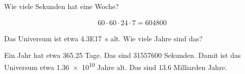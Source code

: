 
\begin{aufgabe}
	Wie viele Sekunden hat eine Woche?
	\begin{loesung}
		\begin{eqnarray*}
			60\cdot60\cdot24\cdot7=\num{604800}
		\end{eqnarray*}
	\end{loesung}
\end{aufgabe}


\begin{aufgabe}
	Das Universum ist etwa \SI{4.3E17}{s} alt. Wie viele Jahre sind das?
	\begin{loesung}
		Ein Jahr hat etwa \num{365.25} Tage. Das sind \num{31557600} Sekunden. 
		Damit ist das Universum etwa \num{1.36e+10} Jahre alt. Das sind \num{13.6} Milliarden Jahre.
	\end{loesung}
\end{aufgabe}
